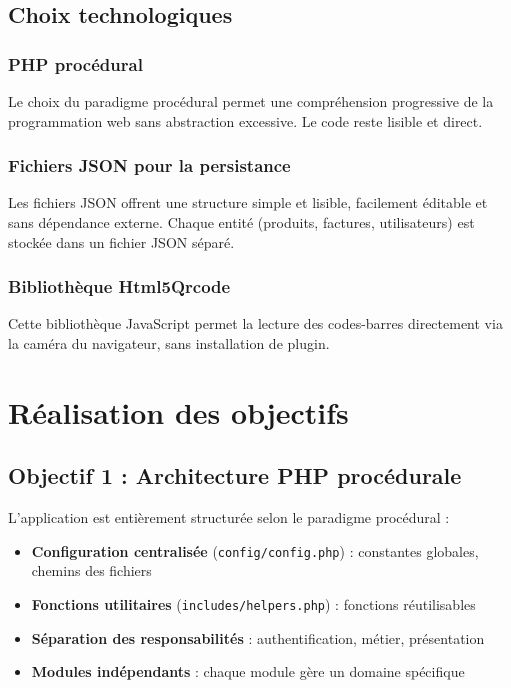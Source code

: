 \documentclass[12pt,a4paper,french]{report}
\begin{document}
\section{Choix technologiques}

\subsection{PHP procédural}
Le choix du paradigme procédural permet une compréhension progressive de la programmation web sans abstraction excessive. Le code reste lisible et direct.

\subsection{Fichiers JSON pour la persistance}
Les fichiers JSON offrent une structure simple et lisible, facilement éditable et sans dépendance externe.
 Chaque entité (produits, factures, utilisateurs) est stockée dans un fichier JSON séparé.

\subsection{Bibliothèque Html5Qrcode}
Cette bibliothèque JavaScript permet la lecture des codes-barres directement via la caméra du navigateur,
 sans installation de plugin.

\chapter{Réalisation des objectifs}

\section{Objectif 1 : Architecture PHP procédurale}

L'application est entièrement structurée selon le paradigme procédural :

\begin{itemize}
    \item \textbf{Configuration centralisée} (\texttt{config/config.php}) : constantes globales, chemins des fichiers
    \item \textbf{Fonctions utilitaires} (\texttt{includes/helpers.php}) : fonctions réutilisables
    \item \textbf{Séparation des responsabilités} : authentification, métier, présentation
    \item \textbf{Modules indépendants} : chaque module gère un domaine spécifique
\end{itemize}
\end{document}
